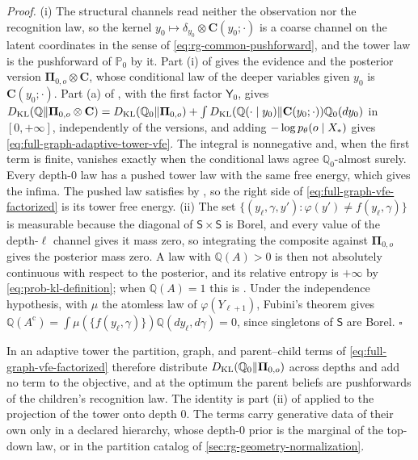 \noindent\emph{Proof.}
(i) The structural channels read neither the observation nor the recognition law, so the
kernel $y_0\mapsto\delta_{y_0}\otimes\mathbf C(y_0;\cdot)$ is a coarse channel on the latent
coordinates in the sense of \eqref{eq:rg-common-pushforward}, and the tower law is the pushforward
of $\mathbb P_0$ by it. Part (i) of  gives the evidence and the
posterior version $\boldsymbol\Pi_{0,o}\otimes\mathbf C$, whose conditional law of the deeper
variables given $y_0$ is $\mathbf C(y_0;\cdot)$. Part (a) of , with
the first factor $\mathsf Y_0$, gives
$D_{\mathrm{KL}}(\mathbb Q\Vert\boldsymbol\Pi_{0,o}\otimes\mathbf C)=D_{\mathrm{KL}}(\mathbb Q_0\Vert\boldsymbol\Pi_{0,o})
+\int D_{\mathrm{KL}}(\mathbb Q(\cdot\mid y_0)\Vert\mathbf C(y_0;\cdot))\mathbb Q_0(dy_0)$ in $[0,+\infty]$,
independently of the versions, and adding $-\log p_\theta(o\mid X_*)$ gives
\eqref{eq:full-graph-adaptive-tower-vfe}. The integral is nonnegative and, when the first term is
finite, vanishes exactly when the conditional laws agree $\mathbb Q_0$-almost surely. Every
depth-$0$ law has a pushed tower law with the same free energy, which gives the infima. The pushed
law satisfies  by , so
the right side of \eqref{eq:full-graph-vfe-factorized} is its tower free energy. (ii) The set
$\{(y_\ell,\gamma,y'):\varphi(y')\ne f(y_\ell,\gamma)\}$ is measurable because the diagonal of
$\mathsf S\times\mathsf S$ is Borel, and every value of the depth-$\ell$ channel gives it mass
zero, so integrating the composite against $\boldsymbol\Pi_{0,o}$ gives the posterior mass zero.
A law with $\mathbb Q(A)>0$ is then not absolutely continuous with respect to the posterior,
and its relative entropy is $+\infty$ by \eqref{eq:prob-kl-definition}; when $\mathbb Q(A)=1$
this is . Under the independence hypothesis, with
$\mu$ the atomless law of $\varphi(Y_{\ell+1})$, Fubini's theorem gives
$\mathbb Q(A^{\mathrm c})=\int\mu(\{f(y_\ell,\gamma)\})\mathbb Q(dy_\ell,d\gamma)=0$, since
singletons of $\mathsf S$ are Borel. $\square$

In an adaptive tower the partition, graph, and parent--child terms of
\eqref{eq:full-graph-vfe-factorized} therefore distribute
$D_{\mathrm{KL}}(\mathbb Q_0\Vert\boldsymbol\Pi_{0,o})$ across depths and add no term to the objective, and
at the optimum the parent beliefs are pushforwards of the children's recognition law. The
identity is part (ii) of
 applied to the projection of the tower onto depth $0$. The terms
carry generative data of their own only in a declared hierarchy, whose depth-$0$ prior is the
marginal of the top-down law, or in the partition catalog of \cref{sec:rg-geometry-normalization}.

